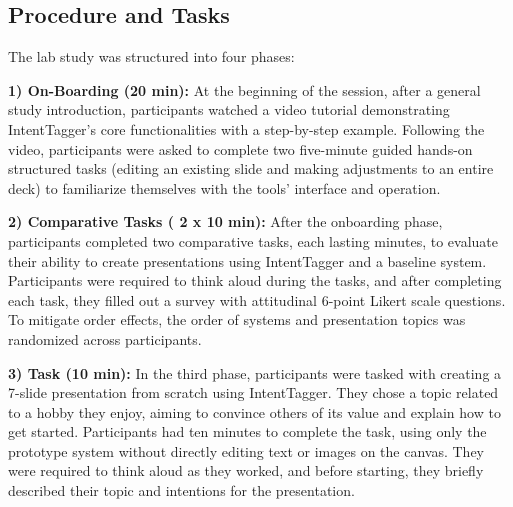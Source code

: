 \subsection{Procedure and Tasks} \label{sec:study-procedure}
The lab study was structured into four phases: 

\textbf{1) On-Boarding (20 min):} At the beginning of the session, after a general study introduction, participants watched a video tutorial demonstrating IntentTagger's core functionalities with a step-by-step example. Following the video, participants were asked to complete two five-minute guided hands-on structured tasks (editing an existing slide and making adjustments to an entire deck) to familiarize themselves with the tools' interface and operation.

\textbf{2) Comparative Tasks ( 2 x 10 min): }
After the onboarding phase, participants completed two comparative tasks, each lasting  minutes, to evaluate their ability to create presentations using IntentTagger and a baseline system. 
Participants were required to think aloud during the tasks, and after completing each task, they filled out a survey with attitudinal 6-point Likert scale questions. 
To mitigate order effects, the order of systems and presentation topics was randomized across participants. 

\textbf{3)  Task (10 min):}
In the third phase, participants were tasked with creating a 7-slide presentation from scratch using IntentTagger. 
They chose a topic related to a hobby they enjoy, aiming to convince others of its value and explain how to get started. 
Participants had ten minutes to complete the task, using only the prototype system without directly editing text or images on the canvas. 
They were required to think aloud as they worked, and before starting, they briefly described their topic and intentions for the presentation. 

